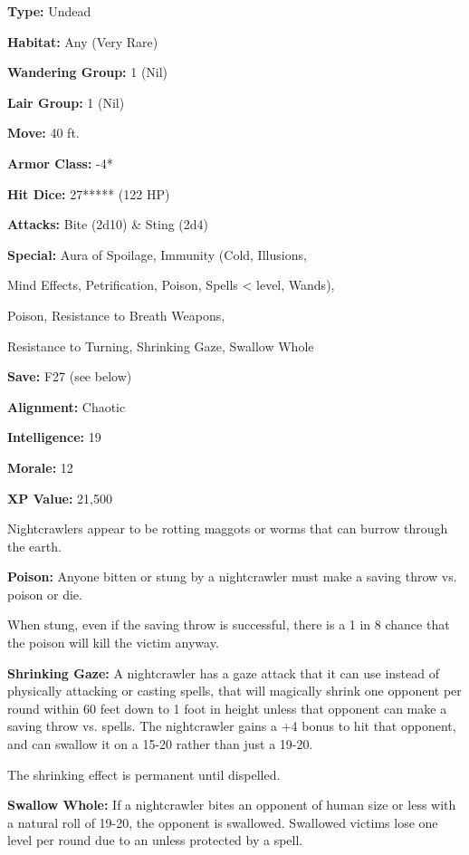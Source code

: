 \begin{multicols*}{2}
{\textbf{Type:} Undead

\textbf{Habitat:} Any (Very Rare)

\textbf{Wandering Group:} 1 (Nil)

\textbf{Lair Group:} 1 (Nil)

\textbf{Move:} 40 ft.

\textbf{Armor Class:} -4*

\textbf{Hit Dice:} 27***** (122 HP)

\textbf{Attacks:} Bite (2d10) \& Sting (2d4)

\textbf{Special:} Aura of Spoilage, Immunity (Cold, Illusions, 

Mind Effects, Petrification, Poison, Spells <  level, Wands), 

Poison, Resistance to Breath Weapons, 

Resistance to Turning, Shrinking Gaze, Swallow Whole

\textbf{Save:} F27 (see below)

\textbf{Alignment:} Chaotic

\textbf{Intelligence:} 19

\textbf{Morale:} 12

\textbf{XP Value:} 21,500}

Nightcrawlers appear to be rotting maggots or worms that can burrow through the earth. 

\textbf{Poison:} Anyone bitten or stung by a nightcrawler must make a saving throw vs. poison or die.

When stung, even if the saving throw is successful, there is a 1 in 8 chance that the poison will kill the victim anyway.

\textbf{Shrinking Gaze:} A nightcrawler has a gaze attack that it can use instead of physically attacking or casting spells, that will magically shrink one opponent per round within 60 feet down to 1 foot in height unless that opponent can make a saving throw vs. spells. The nightcrawler gains a +4 bonus to hit that opponent, and can swallow it on a 15-20 rather than just a 19-20.

The shrinking effect is permanent until dispelled.

\textbf{Swallow Whole:} If a nightcrawler bites an opponent of human size or less with a natural roll of 19-20, the opponent is swallowed. Swallowed victims lose one level per round due to an  unless protected by a  spell.


\end{multicols*}
